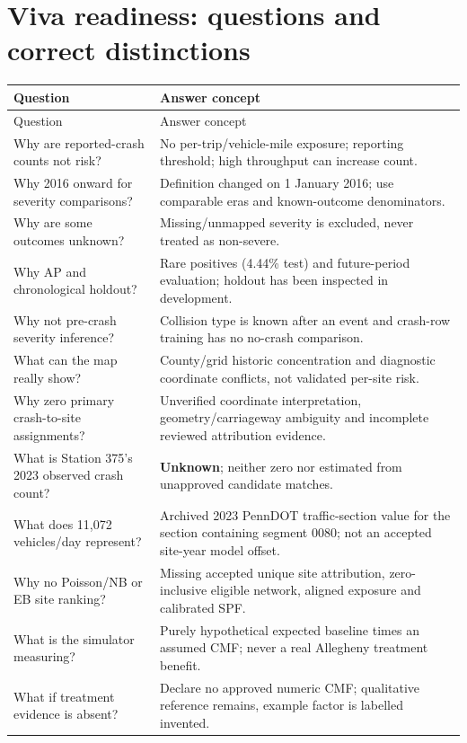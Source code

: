 \documentclass[11pt,a4paper,openany]{report}
\begin{document}
\section{Viva readiness: questions and correct distinctions}
\small
\begin{longtable}{@{}L{67mm}L{80mm}@{}}\toprule Question & Answer concept\\\midrule\endfirsthead
\toprule Question & Answer concept\\\midrule\endhead
Why are reported-crash counts not risk? & No per-trip/vehicle-mile exposure; reporting threshold; high throughput can increase count.\\
Why 2016 onward for severity comparisons? & Definition changed on 1 January 2016; use comparable eras and known-outcome denominators.\\
Why are some outcomes unknown? & Missing/unmapped severity is excluded, never treated as non-severe.\\
Why AP and chronological holdout? & Rare positives (4.44\% test) and future-period evaluation; holdout has been inspected in development.\\
Why not pre-crash severity inference? & Collision type is known after an event and crash-row training has no no-crash comparison.\\
What can the map really show? & County/grid historic concentration and diagnostic coordinate conflicts, not validated per-site risk.\\
Why zero primary crash-to-site assignments? & Unverified coordinate interpretation, geometry/carriageway ambiguity and incomplete reviewed attribution evidence.\\
What is Station 375's 2023 observed crash count? & \textbf{Unknown}; neither zero nor estimated from unapproved candidate matches.\\
What does 11,072 vehicles/day represent? & Archived 2023 PennDOT traffic-section value for the section containing segment 0080; not an accepted site-year model offset.\\
Why no Poisson/NB or EB site ranking? & Missing accepted unique site attribution, zero-inclusive eligible network, aligned exposure and calibrated SPF.\\
What is the simulator measuring? & Purely hypothetical expected baseline times an assumed CMF; never a real Allegheny treatment benefit.\\
What if treatment evidence is absent? & Declare no approved numeric CMF; qualitative reference remains, example factor is labelled invented.\\

\end{longtable}
\end{document}
